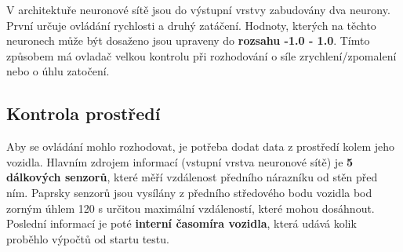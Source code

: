 \documentclass[a4paper,12pt]{article}
\newcommand{\tab}
{
    \hspace*{1em}
}
\begin{document}
            \tab V architektuře neuronové sítě jsou do výstupní vrstvy zabudovány dva neurony.
            První určuje ovládání rychlosti a druhý zatáčení. Hodnoty, kterých na těchto neuronech
            může být dosaženo jsou upraveny do \textbf{rozsahu -1.0 - 1.0}. Tímto způsobem 
            má ovladač velkou kontrolu při rozhodování o síle zrychlení/zpomalení nebo o úhlu zatočení.

        \subsection{Kontrola prostředí}
            Aby se ovládání mohlo rozhodovat, je potřeba dodat data z prostředí kolem 
            jeho vozidla. Hlavním zdrojem informací (vstupní vrstva neuronové sítě) je \textbf{5
            dálkových senzorů}, které měří vzdálenost předního nárazníku od stěn před ním.
            Paprsky senzorů jsou vysílány z předního středového bodu vozidla bod zorným úhlem 
            120\textdegree{} s určitou maximální vzdáleností, které mohou dosáhnout. Poslední informací 
            je poté \textbf{interní časomíra vozidla}, která udává kolik proběhlo výpočtů od startu testu. 
\end{document}

